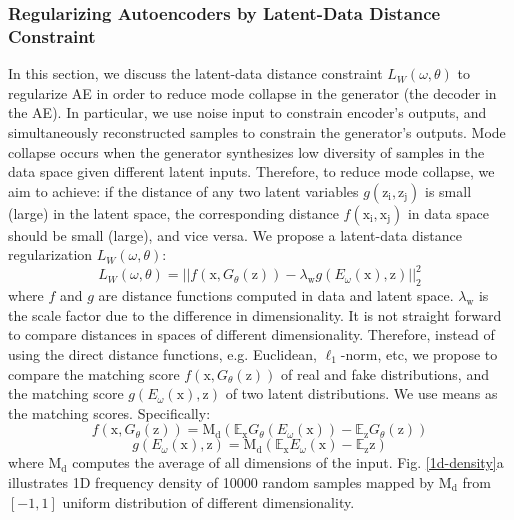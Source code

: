 \documentclass[runningheads]{llncs}
\newcommand*{\eg}{e.g. }
\begin{document}
\subsubsection{Regularizing Autoencoders by Latent-Data Distance Constraint}
In this section, we discuss the latent-data distance constraint $L_W(\omega,\theta)$ to regularize AE in order to reduce mode collapse in the generator (the decoder in the AE).
In particular, we use noise input to constrain encoder's outputs, and simultaneously reconstructed samples to constrain the generator's outputs. Mode collapse occurs when the generator synthesizes  low diversity of samples in the data space given different latent inputs. Therefore, to reduce mode collapse, we aim to achieve:  if the distance of any two latent variables $g(\mathrm{z_i}, \mathrm{z_j})$ is small (large) in the latent space, the corresponding distance $f(\mathrm{x_i}, \mathrm{x_j})$ in data space should be small (large), and vice versa. We propose a latent-data distance regularization $L_W(\omega,\theta)$: 
\begin{equation}
L_W(\omega,\theta) = ||f(\mathrm{x},G_\theta(\mathrm{z})) - \lambda_{\mathrm{w}}g(E_\omega(\mathrm{x}),\mathrm{z})||_2^2
\label{ae_regularization}
\end{equation}
where $f$ and $g$ are distance functions computed in data and latent space. $\lambda_{\mathrm{w}}$ is the scale factor due to the difference in dimensionality. 
It is not straight forward to compare distances in spaces of different dimensionality. Therefore, instead of using the direct distance functions, \eg Euclidean, $\ell_1$-norm, etc, we propose to  compare the matching score   $f(\mathrm{x},G_\theta(\mathrm{z}))$ of real and fake distributions,  and the matching score $g(E_\omega(\mathrm{x}),\mathrm{z})$ of two latent distributions. We use means as the matching scores. Specifically:
\begin{equation}
f(\mathrm{x},G_\theta(\mathrm{z})) = \mathrm{M_d}(\mathbb{E}_{\mathrm{x}}G_\theta(E_\omega(\mathrm{x})) - \mathbb{E}_{\mathrm{z}} G_\theta(\mathrm{z}))
\end{equation}
\begin{equation}
g(E_\omega(\mathrm{x}),\mathrm{z}) = \mathrm{M_d}(\mathbb{E}_{\mathrm{x}}E_\omega(\mathrm{x}) - \mathbb{E}_{\mathrm{z}}\mathrm{z})
\end{equation}
where $\mathrm{M_d}$ computes the average of all dimensions of the input. Fig. \ref{1d-density}a illustrates 1D frequency density of 10000 random samples mapped by $\mathrm{M_d}$ from $[-1,1]$ uniform distribution of different dimensionality.
\end{document}
